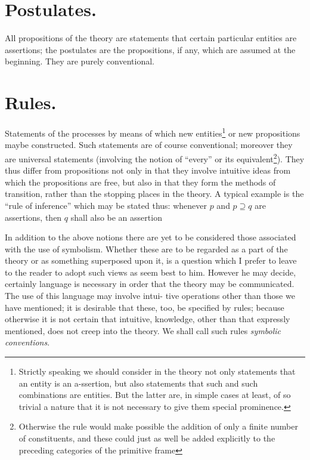 \documentclass[10pt, twoside]{extarticle}
\theoremstyle{breaktheorem}
\theoremstyle{mylemma}
\theoremstyle{mydefinition}
\theoremstyle{mycorollary}
\begin{document}
\section{Postulates.}
\indent All propositions of the theory are statements that certain particular
entities are assertions; the postulates are the propositions, if any, which are
assumed at the beginning. They are purely conventional.

\section{Rules.}
\indent Statements of the processes by means of which new entities\footnote{Strictly speaking we should consider in the theory not only statements that an entity is an a-ssertion, but also statements that such and such combinations are entities. But the latter are, in simple cases at least, of so trivial a nature that it is not necessary to give them special prominence.} or new
propositions maybe constructed. Such statements are of course conventional;
moreover they are universal statements (involving the notion of ``every''
or its equivalent\footnote{Otherwise the rule would make possible the addition of only a finite number of constituents, and these could just as well be added explicitly to the preceding categories of the primitive frame}). They thus differ from propositions not only in that
they involve intuitive ideas from which the propositions are free, but also in
that they form the methods of transition, rather than the stopping places in
the theory. A typical example is the ``rule of inference'' which may be
stated thus: whenever \(p\) and \(p \supseteq q\) are assertions, then \(q\) shall also be an
assertion

\vspace{1em}
In addition to the above notions there are yet to be considered those
associated with the use of symbolism. Whether these are to be regarded as
a part of the theory or as something superposed upon it, is a question which
I prefer to leave to the reader to adopt such views as seem best to him.
However he may decide, certainly language is necessary in order that the
theory may be communicated. The use of this language may involve intui-
tive operations other than those we have mentioned; it is desirable that these,
too, be specified by rules; because otherwise it is not certain that intuitive,
knowledge, other than that expressly mentioned, does not creep into the theory.
We shall call such rules \textit{symbolic conventions}.
\end{document}
